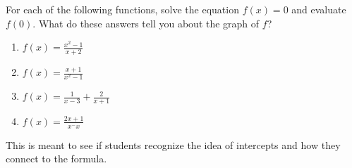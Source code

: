 \documentclass[noauthor]{ximera}
\begin{document}
\begin{problem}
For each of the following functions, solve the equation \(f(x) = 0\)
and evaluate \(f(0)\). What do these answers tell you about the graph 
of \(f\)?

\begin{enumerate}
    \item \(f(x) = \frac{x^2 - 1}{x + 2}\)
    \item \(f(x) = \frac{x + 1}{x^2 - 1}\)
    \item \(f(x) = \frac{1}{x - 3} + \frac{2}{x + 1}\)
    \item \(f(x) = \frac{2x + 1}{x^ - x}\)
\end{enumerate}

\begin{instructorNotes}
This is meant to see if students recognize the idea of intercepts and how
they connect to the formula.
\end{instructorNotes}
\end{problem}
\end{document}
